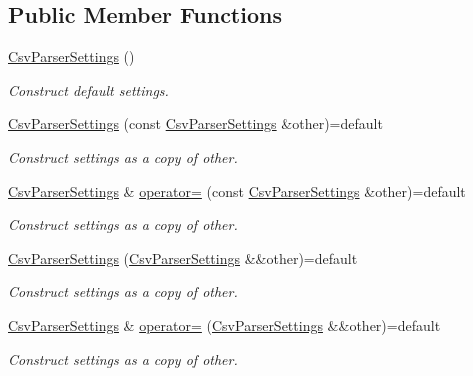 \subsection*{Public Member Functions}
\begin{DoxyCompactItemize}
\item 
\hyperlink{class_mdt_1_1_plain_text_1_1_csv_parser_settings_a478e33bc5b599b9f37e51e7932ca7089}{Csv\+Parser\+Settings} ()
\begin{DoxyCompactList}\small\item\em Construct default settings. \end{DoxyCompactList}\item 
\hyperlink{class_mdt_1_1_plain_text_1_1_csv_parser_settings_a13d6b4aa193caa6626577eaebac51028}{Csv\+Parser\+Settings} (const \hyperlink{class_mdt_1_1_plain_text_1_1_csv_parser_settings}{Csv\+Parser\+Settings} \&other)=default
\begin{DoxyCompactList}\small\item\em Construct settings as a copy of {\itshape other}. \end{DoxyCompactList}\item 
\hyperlink{class_mdt_1_1_plain_text_1_1_csv_parser_settings}{Csv\+Parser\+Settings} \& \hyperlink{class_mdt_1_1_plain_text_1_1_csv_parser_settings_a6755c057e7d04afb0cab6bcaa3ffb652}{operator=} (const \hyperlink{class_mdt_1_1_plain_text_1_1_csv_parser_settings}{Csv\+Parser\+Settings} \&other)=default
\begin{DoxyCompactList}\small\item\em Construct settings as a copy of {\itshape other}. \end{DoxyCompactList}\item 
\hyperlink{class_mdt_1_1_plain_text_1_1_csv_parser_settings_a88ebdf75dc028676bda13c37a437aad2}{Csv\+Parser\+Settings} (\hyperlink{class_mdt_1_1_plain_text_1_1_csv_parser_settings}{Csv\+Parser\+Settings} \&\&other)=default
\begin{DoxyCompactList}\small\item\em Construct settings as a copy of {\itshape other}. \end{DoxyCompactList}\item 
\hyperlink{class_mdt_1_1_plain_text_1_1_csv_parser_settings}{Csv\+Parser\+Settings} \& \hyperlink{class_mdt_1_1_plain_text_1_1_csv_parser_settings_a1d46a0ea41d380b8db95cb9d95c2190b}{operator=} (\hyperlink{class_mdt_1_1_plain_text_1_1_csv_parser_settings}{Csv\+Parser\+Settings} \&\&other)=default
\begin{DoxyCompactList}\small\item\em Construct settings as a copy of {\itshape other}. \end{DoxyCompactList}\item 

\end{DoxyCompactItemize}
